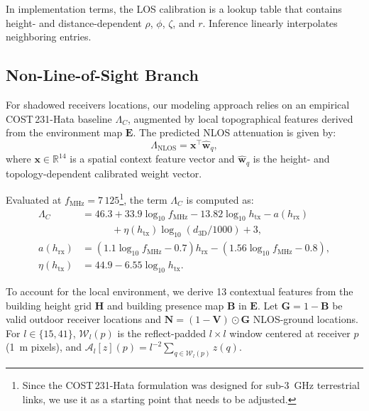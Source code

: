 \documentclass[10pt,conference,letterpaper]{IEEEtran}
\begin{document}
In implementation terms, the LOS calibration is a lookup table that contains height- and distance-dependent $\rho$, $\phi$, $\zeta$, and $r$. Inference linearly interpolates neighboring entries.

\subsection{Non-Line-of-Sight Branch}
\label{sec:nlos}

For shadowed receivers locations, our modeling approach relies on an empirical COST\,231-Hata baseline $\Lambda_C$, augmented by local topographical features derived from the environment map $\mathbf{E}$. The predicted NLOS attenuation is given by:
\begin{equation}
\Lambda_{\text{NLOS}} = \mathbf{x}^\top \hat{\mathbf{w}}_q,
\label{eq:pl_nlos}
\end{equation}
where $\mathbf{x} \in \mathbb{R}^{14}$ is a spatial context feature vector and $\hat{\mathbf{w}}_q$ is the height- and topology-dependent calibrated weight vector.

Evaluated at $f_{\text{MHz}} = 7\,125$\footnote{Since the COST\,231-Hata formulation was designed for sub-3~GHz terrestrial links, we use it as a starting point that needs to be adjusted.}, the term $\Lambda_C$ is computed as:
\begin{align}
\Lambda_C &= 46.3 + 33.9 \log_{10} f_{\text{MHz}} - 13.82 \log_{10} h_{\text{tx}} - a(h_{\text{rx}}) \nonumber \\
&\qquad\quad + \eta(h_{\text{tx}}) \log_{10} (d_{\text{3D}}/1000) + 3,\\ a(h_{\text{rx}}) &= (1.1 \log_{10} f_{\text{MHz}} - 0.7) h_{\text{rx}} - (1.56 \log_{10} f_{\text{MHz}} - 0.8), \\
\eta(h_{\text{tx}}) &= 44.9 - 6.55 \log_{10} h_{\text{tx}}.
\label{eq:cost}
\end{align}

To account for the local environment, we derive 13 contextual features from the building height grid $\mathbf{H}$ and building presence map $\mathbf{B}$ in $\mathbf{E}$. Let $\mathbf{G} = 1 - \mathbf{B}$ be valid outdoor receiver locations and $\mathbf{N} = (1 - \mathbf{V}) \odot \mathbf{G}$ NLOS-ground locations. For $l \in \{15,41\}$, $\mathcal{W}_l(p)$ is the reflect-padded $l\times l$ window centered at receiver $p$ (\SI{1}{m} pixels), and $\mathcal{A}_l[z](p) = l^{-2} \sum_{q \in \mathcal{W}_l(p)} z(q)$.
\end{document}
